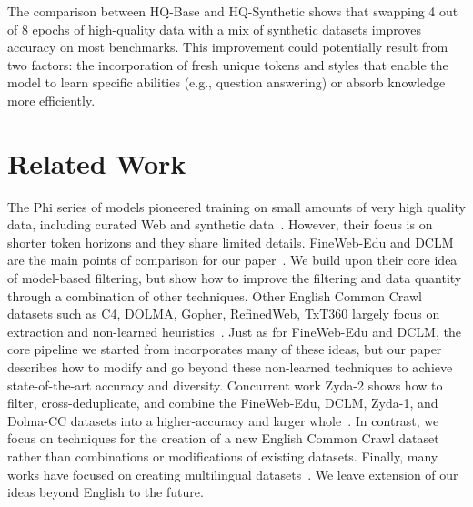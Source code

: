 \documentclass[11pt]{article}
\newcommand{\DCLM}{\textsc{DCLM}\xspace}
\begin{document}
The comparison between HQ-Base and HQ-Synthetic shows that swapping 4 out of 8 epochs of high-quality data with a mix of synthetic datasets improves accuracy on most benchmarks.
This improvement could potentially result from two factors: the incorporation  of fresh unique tokens and styles that enable the model to learn specific abilities (e.g., question answering) or absorb knowledge more efficiently.





\section{Related Work}
The Phi series of models pioneered training on small amounts of very high quality data, including curated Web and synthetic data~\citep{gunasekar2023textbooks,li2023textbooks,abdin2024phi}. However, their focus is on shorter token horizons and they share limited details. FineWeb-Edu and \DCLM are the main points of comparison for our paper~\citep{li2024datacomp,penedo2024fineweb}. We build upon their core idea of model-based filtering, but show how to improve the filtering and data quantity through a combination of other techniques. Other English Common Crawl datasets such as C4, DOLMA, Gopher, RefinedWeb, TxT360 largely focus on extraction and non-learned heuristics~\citep{penedo2023refinedweb,soldaini2024dolma,rae2021scaling,raffel2020exploring,txt360data2024}. Just as for FineWeb-Edu and \DCLM, the core pipeline we started from incorporates many of these ideas, but our paper describes how to modify and go beyond these non-learned techniques to achieve state-of-the-art accuracy and diversity. Concurrent work Zyda-2 shows how to filter, cross-deduplicate, and combine the FineWeb-Edu, \DCLM, Zyda-1, and Dolma-CC datasets into a higher-accuracy and larger whole~\citep{tokpanov2024zyda25trilliontoken}. In contrast, we focus on techniques for the creation of a new English Common Crawl dataset rather than combinations or modifications of existing datasets. Finally, many works have focused on creating multilingual datasets~\citep{xue-etal-2021-mt5,brack-etal-2024-community,abadji-etal-2022-towards,wenzek-etal-2020-ccnet,kudugunta2023madlad400multilingualdocumentlevellarge}. We leave extension of our ideas beyond English to the future.
\end{document}
